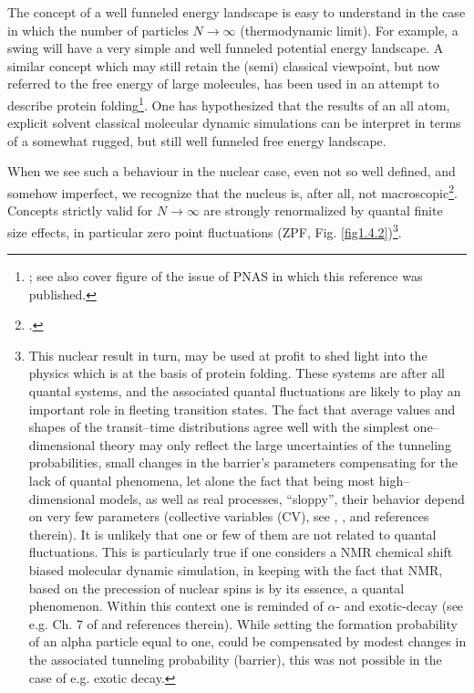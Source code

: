  
 
 The concept of a well funneled energy landscape  is easy to understand in the case in which the number of particles $N\rightarrow \infty$ (thermodynamic limit). For example, a swing will have a very simple and well funneled potential energy landscape. A similar concept which may still retain the (semi) classical viewpoint, but now referred to the free energy of large molecules, has been used in an attempt to describe protein folding\footnote{\cite{Wolynes:16,Wolynes:12}; see also cover figure of the issue of PNAS in which this reference was published.}. One has hypothesized that the results of an all atom, explicit solvent classical molecular dynamic simulations can be interpret in terms of a somewhat rugged, but still well funneled free energy landscape.

When we see such a behaviour in the nuclear case, even not so well defined, and somehow imperfect, we recognize that the nucleus is, after all, not macroscopic\footnote{\cite{Anderson:72}.}. Concepts strictly valid for $N\rightarrow\infty$ are strongly renormalized by quantal finite size effects, in particular zero point fluctuations (ZPF, Fig. \ref{fig1.4.2})\footnote{This nuclear result in turn, may be used at profit to shed light into the physics which is at the basis of protein folding. These systems are after all quantal systems, and the associated quantal fluctuations are likely to play an important role in fleeting transition states. The fact that average values and shapes of the transit--time distributions agree well with the simplest one--dimensional theory may only reflect the large uncertainties of the tunneling probabilities, small changes in the barrier's parameters compensating for the lack of quantal phenomena, let alone the fact that being most high--dimensional models, as well as real processes, ``sloppy'', their behavior depend on very few parameters (collective variables (CV), see \cite{Buchanan:15}, \cite{Transtrum:15}, and references therein). It is unlikely that one or few of them are not  related to quantal fluctuations. This is particularly true if one considers a NMR chemical shift biased molecular dynamic simulation, in keeping with the fact that NMR, based  on the precession of nuclear spins is by its essence, a quantal phenomenon. Within this context one is reminded of $\alpha$- and exotic-decay (see e.g. Ch. 7 of \cite{Brink:05} and references therein). While setting the formation probability of an alpha particle equal to one, could be compensated by modest changes in the associated tunneling probability (barrier), this was not possible in the case of e.g. exotic decay.}.

